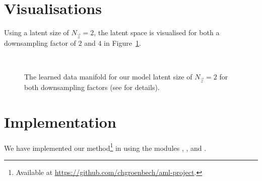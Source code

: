 \section{Visualisations}
\label{sec:visualisations}

Using a latent size of $N_{\vec{z}} = 2$, the latent space is visualised for both a downsampling factor of $2$ and $4$ in Figure~\ref{fig:manifold}.

\begin{figure}
    \centering
    \\
    \caption{The learned data manifold for our model latent size of $N_{\vec{z}} = 2$ for both downsampling factors (see \cite{Kingma2013} for details).}
    \label{fig:manifold}
\end{figure}


\section{Implementation}
\label{sec:implementation}

We have implemented our method\footnote{Available at \url{https://github.com/chgroenbech/aml-project}.} in \Python using the modules \Theano, \Lasagne, and \Parmesan.
